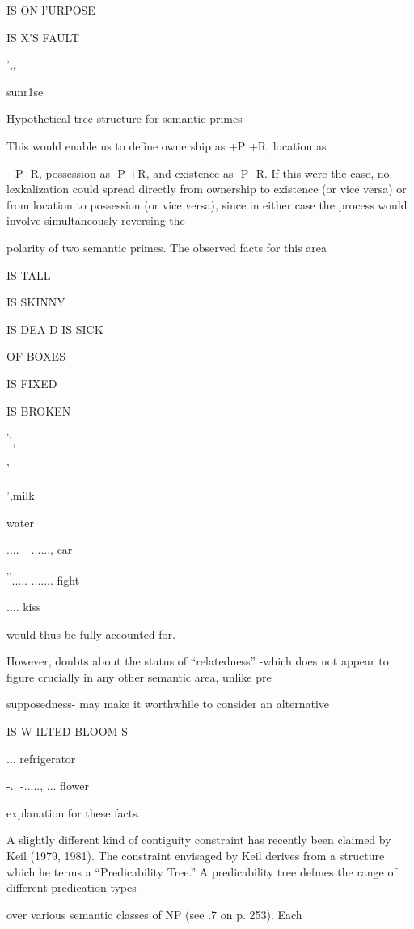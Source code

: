 IS ON l'URPOSE

IS X'S FAULT

',,

sunr1se

Hypothetical tree structure for semantic primes

This would enable us to define ownership as +P +R, location as

+P {}-R, possession as {}-P +R, and existence as {}-P {}-R. If this were the case, no lexkalization could spread directly from ownership to exis\-tence (or vice versa) or from location to possession (or vice versa), since in either case the process would involve simultaneously reversing the

polarity of two semantic primes. The observed facts for this area

IS TALL

IS SKINNY 

IS DEA D IS SICK

OF BOXES

IS FIXED

IS BROKEN

\textsuperscript{'}',

'

',milk

water

....\_ ......, car

\textsuperscript{'}\textsuperscript{'}..... ....... fight

.... kiss

would thus be fully accounted for. 

However, doubts about the status of ``relatedness'' {}-which does not appear to figure crucially in any other semantic area, unlike pre\-

supposedness- may make it worthwhile to consider an alternative

IS W ILTED BLOOM S 

... refrigerator

{}-.. {}-....., ... flower

explanation for these facts.

A slightly different kind of contiguity constraint has recently been claimed by Keil (1979, 1981). The constraint envisaged by Keil derives from a structure which he terms a ``Predicability Tree.'' A predicability tree defmes the range of different predication types

over various semantic classes of NP (see .7 on p. 253). Each

